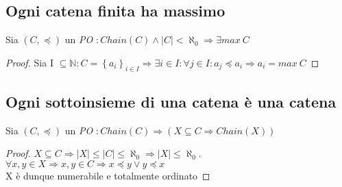 \subsection{Ogni catena finita ha massimo}
\begin{esercizio}
  Sia $(C, \preceq)$ un \emph{PO} $: Chain(C) \land |C| < \aleph_0 \Rightarrow \exists max\ C$
  \begin{proof}
    Sia I $\subseteq \mathbb{N} : C = \left\{a_i\right\}_{i \in I} \Rightarrow \exists i \in I : \forall j \in I : a_j \preceq a_i \Rightarrow a_i = max\ C$
    \end{proof}
\end{esercizio}

\subsection{Ogni sottoinsieme di una catena è una catena}
\begin{esercizio}
  Sia $(C, \preceq)$ un \emph{PO} $: Chain(C) \Rightarrow (X \subseteq C \Rightarrow Chain(X))$
  \begin{proof}
    $X \subseteq C \Rightarrow |X| \leq |C| \leq \aleph_0 \Rightarrow |X| \leq \aleph_0$. $\forall x,y \in X \Rightarrow x,y \in C \Rightarrow x \preceq y \lor y \preceq x$\\
    X è dunque numerabile e totalmente ordinato
  \end{proof}
\end{esercizio}

